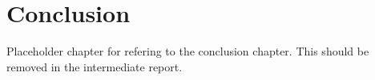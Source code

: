 \chapter{Conclusion}
\label{chapter:conclusion}
Placeholder chapter for refering to the conclusion chapter. This should be removed in the intermediate report.